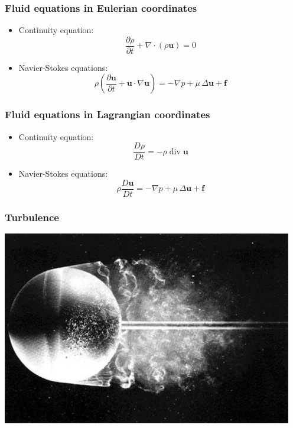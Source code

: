 \documentclass[12pt,english,dvipsnames]{beamer}
\renewcommand{\vec}{\mathbf}
\newcommand{\vel}{\vec u}    %
\DeclareMathOperator{\divergence}{div}
\newcommand{\pd}[2]{\frac{\partial #1}{\partial #2}}
\newcommand{\md}[2]{\frac{D#1}{D#2}}
\begin{document}
  \begin{frame}
    \frametitle{Fluid equations in Eulerian coordinates}
    \begin{itemize}
      \item Continuity equation:
        \begin{equation}
          \pd{ρ}{t} + ∇\cdot(ρ\vel) = 0
        \end{equation}
      \item Navier-Stokes equations:
        \begin{equation}
          ρ\left(\pd{\vel}{t} + \vel\cdot∇\vel\right) = -∇p + μ\,Δ\vel + \vec{f}
        \end{equation}
    \end{itemize}
  \end{frame}

  \begin{frame}
    \frametitle{Fluid equations in Lagrangian coordinates}
    \begin{itemize}
      \item Continuity equation:
        \begin{equation}
          \md{ρ}{t} = -ρ\divergence\vel
        \end{equation}
      \item Navier-Stokes equations:
        \begin{equation}
          ρ\md{\vel}{t} = -∇p + μ\,Δ\vel + \vec{f}
        \end{equation}
    \end{itemize}
  \end{frame}

  \begin{frame}
    \frametitle{Turbulence}
    \begin{center}
      \includegraphics[scale=.9]{flow-past-sphere.jpg}
    \end{center}
  \end{frame}
\end{document}
